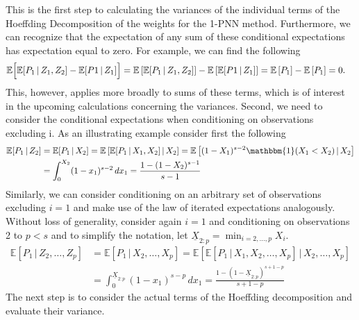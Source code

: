 \documentclass[letterpaper,10pt]{article}
\numberwithin{equation}{section}
\numberwithin{thm}{section}
\newcommand{\E}{\mathbb{E}}
\newcommand{\1}{\mathbb{1}}
\begin{document}
This is the first step to calculating the variances of the individual terms of the Hoeffding Decomposition of the weights for the 1-PNN method.
Furthermore, we can recognize that the expectation of any sum of these conditional expectations has expectation equal to zero.
For example, we can find the following
\begin{equation*}
	\begin{aligned}
		\E\Bigl[\E[P_1 \, | \, Z_1, Z_2] - \E[P1 \, | \, Z_1]\Bigr]
		 & = \E\left[\E[P_1 \, | \, Z_1, Z_2]\right] - \E\left[\E[P1 \, | \, Z_1]\right]
		= \E\left[P_1\right] - \E\left[P_1\right]
		= 0.
	\end{aligned}
\end{equation*}
This, however, applies more broadly to sums of these terms, which is of interest in the upcoming calculations concerning the variances.
Second, we need to consider the conditional expectations when conditioning on observations excluding i.
As an illustrating example consider first the following
\begin{equation*}
	\begin{aligned}
		\mathbb{E}[P_1 \, | \, Z_2]
		 & = \mathbb{E}[P_1 \, | \, X_2]
		= \mathbb{E}\left[\mathbb{E}[P_1 \, | \, X_1, X_2] \, | \, X_2\right]
		= \mathbb{E}\left[(1 - X_1)^{s-2} \mathbbm{1}(X_1 < X_2) \, | \, X_2\right] \\
		 & = \int_{0}^{X_2}(1 - x_1)^{s-2} \, dx_1
		= \frac{1 - (1-X_2)^{s-1}}{s-1}
	\end{aligned}
\end{equation*}
Similarly, we can consider conditioning on an arbitrary set of observations excluding $i=1$ and make use of the law of iterated expectations analogously.
Without loss of generality, consider again $i = 1$ and conditioning on observations 2 to $p < s$ and to simplify the notation, let $\underline{X}_{2:p} = \min_{i = 2, \dotsc, p} X_i$.
\begin{equation*}
	\begin{aligned}
		\mathbb{E}[P_1 \, | \, Z_2, \dotsc, Z_p]
		 & = \mathbb{E}[P_1 \, | \, X_2, \dotsc, X_p]
		= \mathbb{E}\left[\mathbb{E}\left[P_1 \, | \, X_1, X_2, \dotsc, X_p\right] \, | \, X_2, \dotsc, X_p\right] \\
		 & = \int_{0}^{\underline{X}_{2:p}}(1 - x_1)^{s-p} \, d x_1
		= \frac{1 - (1 - \underline{X}_{2:p})^{s+1-p}}{s + 1 - p}
	\end{aligned}
\end{equation*}
The next step is to consider the actual terms of the Hoeffding decomposition and evaluate their variance.
\end{document}
